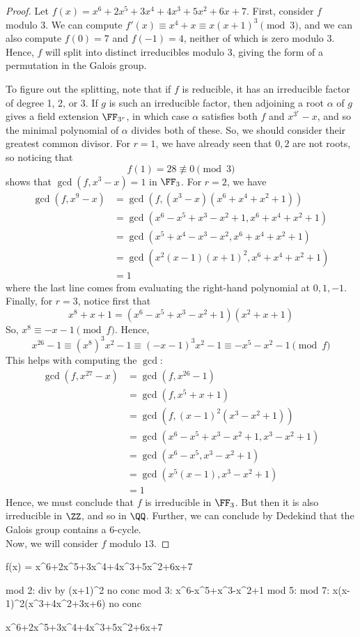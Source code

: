 \begin{proof}
	Let $f(x) = x^6+2x^5+3x^4+4x^3+5x^2+6x+7$. First, consider $f$ modulo 3. We can compute $f'(x) \equiv x^4+x \equiv x(x+1)^3 \pmod{3}$, and we can also compute $f(0) = 7$ and $f(-1) = 4$, neither of which is zero modulo $3$. Hence, $f$ will split into distinct irreducibles modulo 3, giving the form of a permutation in the Galois group.
	
	To figure out the splitting, note that if $f$ is reducible, it has an irreducible factor of degree 1, 2, or 3. If $g$ is such an irreducible factor, then adjoining a root $\alpha$ of $g$ gives a field extension $\FF_{3^r}$, in which case $\alpha$ satisfies both $f$ and $x^{3^r}-x$, and so the minimal polynomial of $\alpha$ divides both of these. So, we should consider their greatest common divisor. For $r=1$, we have already seen that $0,2$ are not roots, so noticing that
	\[ f(1) = 28 \not\equiv 0 \pmod{3} \]
	shows that $\gcd(f,x^3-x) = 1$ in $\FF_3$. For $r=2$, we have
	\begin{align*}
	\gcd(f,x^9-x)
		&= \gcd(f,(x^3-x)(x^6+x^4+x^2+1)) \\
		&= \gcd(x^6-x^5+x^3-x^2+1,x^6+x^4+x^2+1) \\
		&= \gcd(x^5+x^4-x^3-x^2,x^6+x^4+x^2+1) \\
		&= \gcd(x^2(x-1)(x+1)^2,x^6+x^4+x^2+1) \\
		&= 1
	\end{align*}
	where the last line comes from evaluating the right-hand polynomial at $0,1,-1$. Finally, for $r=3$, notice first that
	\[ x^8+x+1 = (x^6-x^5+x^3-x^2+1)(x^2+x+1) \]
	So, $x^8 \equiv -x-1 \pmod{f}$. Hence,
	\[ x^{26} - 1 \equiv (x^8)^3x^2 - 1 \equiv (-x-1)^3x^2-1 \equiv -x^5-x^2-1 \pmod{f} \]
	This helps with computing the $\gcd$:
	\begin{align*}
	\gcd(f,x^{27}-x)
		&= \gcd(f,x^{26}-1) \\
		&= \gcd(f,x^5+x+1) \\
		&= \gcd(f,(x-1)^2(x^3-x^2+1)) \\
		&= \gcd(x^6-x^5+x^3-x^2+1,x^3-x^2+1) \\
		&= \gcd(x^6-x^5,x^3-x^2+1) \\
		&= \gcd(x^5(x-1),x^3-x^2+1) \\
		&= 1
	\end{align*}
	Hence, we must conclude that $f$ is irreducible in $\FF_3$. But then it is also irreducible in $\ZZ$, and so in $\QQ$. Further, we can conclude by Dedekind that the Galois group contains a $6$-cycle. \\
	
	Now, we will consider $f$ modulo $13$.
\end{proof}

f(x) = x^6+2x^5+3x^4+4x^3+5x^2+6x+7


mod 2: div by (x+1)^2			no conc
mod 3: x^6-x^5+x^3-x^2+1		
mod 5: 
mod 7: x(x-1)^2(x^3+4x^2+3x+6)	no conc

x^6+2x^5+3x^4+4x^3+5x^2+6x+7




